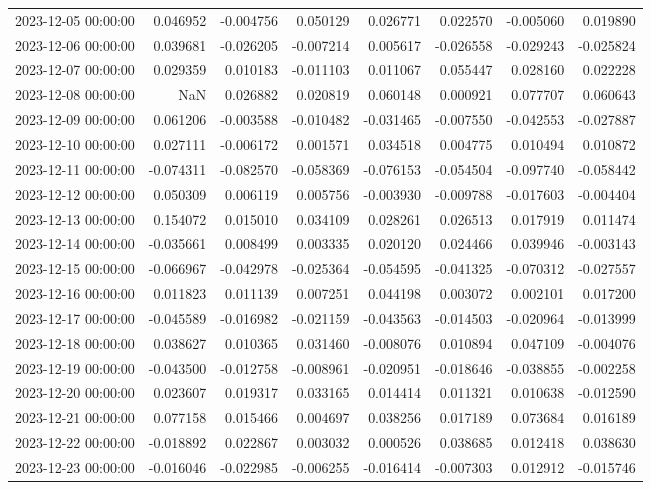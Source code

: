 \begin{tabular}{lrrrrrrr}
2023-12-05 00:00:00 & 0.046952 & -0.004756 & 0.050129 & 0.026771 & 0.022570 & -0.005060 & 0.019890 \\
2023-12-06 00:00:00 & 0.039681 & -0.026205 & -0.007214 & 0.005617 & -0.026558 & -0.029243 & -0.025824 \\
2023-12-07 00:00:00 & 0.029359 & 0.010183 & -0.011103 & 0.011067 & 0.055447 & 0.028160 & 0.022228 \\
2023-12-08 00:00:00 & NaN & 0.026882 & 0.020819 & 0.060148 & 0.000921 & 0.077707 & 0.060643 \\
2023-12-09 00:00:00 & 0.061206 & -0.003588 & -0.010482 & -0.031465 & -0.007550 & -0.042553 & -0.027887 \\
2023-12-10 00:00:00 & 0.027111 & -0.006172 & 0.001571 & 0.034518 & 0.004775 & 0.010494 & 0.010872 \\
2023-12-11 00:00:00 & -0.074311 & -0.082570 & -0.058369 & -0.076153 & -0.054504 & -0.097740 & -0.058442 \\
2023-12-12 00:00:00 & 0.050309 & 0.006119 & 0.005756 & -0.003930 & -0.009788 & -0.017603 & -0.004404 \\
2023-12-13 00:00:00 & 0.154072 & 0.015010 & 0.034109 & 0.028261 & 0.026513 & 0.017919 & 0.011474 \\
2023-12-14 00:00:00 & -0.035661 & 0.008499 & 0.003335 & 0.020120 & 0.024466 & 0.039946 & -0.003143 \\
2023-12-15 00:00:00 & -0.066967 & -0.042978 & -0.025364 & -0.054595 & -0.041325 & -0.070312 & -0.027557 \\
2023-12-16 00:00:00 & 0.011823 & 0.011139 & 0.007251 & 0.044198 & 0.003072 & 0.002101 & 0.017200 \\
2023-12-17 00:00:00 & -0.045589 & -0.016982 & -0.021159 & -0.043563 & -0.014503 & -0.020964 & -0.013999 \\
2023-12-18 00:00:00 & 0.038627 & 0.010365 & 0.031460 & -0.008076 & 0.010894 & 0.047109 & -0.004076 \\
2023-12-19 00:00:00 & -0.043500 & -0.012758 & -0.008961 & -0.020951 & -0.018646 & -0.038855 & -0.002258 \\
2023-12-20 00:00:00 & 0.023607 & 0.019317 & 0.033165 & 0.014414 & 0.011321 & 0.010638 & -0.012590 \\
2023-12-21 00:00:00 & 0.077158 & 0.015466 & 0.004697 & 0.038256 & 0.017189 & 0.073684 & 0.016189 \\
2023-12-22 00:00:00 & -0.018892 & 0.022867 & 0.003032 & 0.000526 & 0.038685 & 0.012418 & 0.038630 \\
2023-12-23 00:00:00 & -0.016046 & -0.022985 & -0.006255 & -0.016414 & -0.007303 & 0.012912 & -0.015746 \\

\end{tabular}

